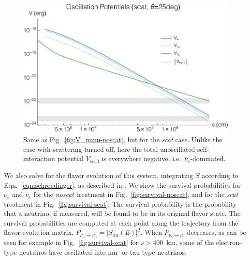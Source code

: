 \documentclass[aps,floatfix,prd,superscriptaddress,twocolumn]{revtex4-1}
\begin{document}
\begin{figure}
  \includegraphics[width=\columnwidth]{20171223-potentials-Ve_Vnue_Vnua_Vnu-000Mo-025deg-scat}
  \caption{Same as Fig.~\ref{fig:V_nunu-noscat},
    but for the \emph{scat} case.
    Unlike the case with scattering turned off,
    here the total unoscillated self-interaction potential $V_{\nu\nu,0}$
    is everywhere negative, i.e.\ $\bar{\nu}_e$-dominated.
    }
  \label{fig:V_nunu-scat}
\end{figure}

We also solve for the flavor evolution of this system,
integrating $S$ according to Eqn.~\ref{eqn:schroedinger},
as described in \cite{zhu2016-mnr_nsns_remnant}.
We show the survival probabilities for $\nu_e$ and $\bar{\nu}_e$
for the \emph{noscat} treatment in Fig.~\ref{fig:survival-noscat},
and for the \emph{scat} treatment in Fig.~\ref{fig:survival-scat}.
The survival probability is the probability that a neutrino, if measured,
will be found to be in its original flavor state.
The survival probabilities are computed at each point along the trajectory
from the flavor evolution matrix,
$P_{\nu_\alpha \to \nu_\alpha} = |S_{\alpha \alpha}(E)|^2$.
When $P_{\nu_e \to \nu_e}$ decreases,
as can be seen for example in Fig.~\ref{fig:survival-scat} for $s>400$~km,
some of the electron-type neutrinos have oscillated into
mu- or tau-type neutrinos.
\end{document}
